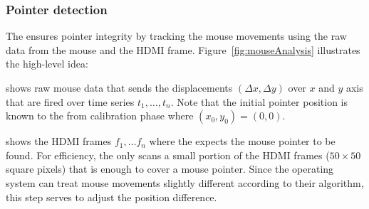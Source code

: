 \subsubsection{\bfseries Pointer detection} The \device ensures pointer integrity by tracking the mouse movements using the raw data from the mouse and the HDMI frame.  Figure~\ref{fig:mouseAnalysis} illustrates the high-level idea: 

\begin{mylist}
\item[]\one shows raw mouse data that sends the displacements $(\Delta x, \Delta y)$ over $x$ and $y$ axis that are fired over time series $t_1,\ldots, t_n$. Note that the initial pointer position is known to the \device from calibration phase where $(x_0, y_0) = (0, 0)$.  
\item[]\two shows the HDMI frames $f_1,\ldots f_n$ where the \device expects the mouse pointer to be found. For efficiency, the \device only scans a small portion of the HDMI frames ($50 \times 50$ square pixels) that is enough to cover a mouse pointer. Since the operating system can treat mouse movements slightly different according to their algorithm, this step serves to adjust the position difference.
\end{mylist}




